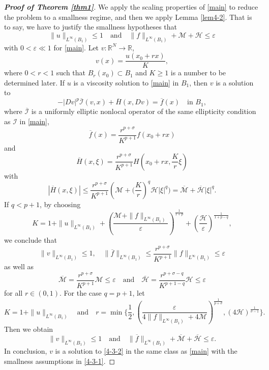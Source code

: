 \documentclass[11pt,reqno]{amsart}
\numberwithin{equation}{section}
\begin{document}
\begin{proof}[\textbf{Proof of Theorem \ref{thm1}}]
We apply the scaling properties of \eqref{main} to reduce the problem to a smallness regime, and then we apply Lemma \ref{lem4-2}. That is to say, we have to justify the smallness hypotheses that
\begin{equation}
\label{4-3-1}
\|u\|_{L^\infty(B_1)}\le1 \quad\text{and}\quad  \|f\|_{L^\infty(B_1)}+\mathcal{M}+\mathcal{H}\le \varepsilon
\end{equation}
with $0<\varepsilon\ll1$ for \eqref{main}. Let $v:\mathbb{R}^N\rightarrow\mathbb{R}$,
$$
v(x)=\frac{u(x_0+rx)}{K},
$$
where $0<r<1$ such that $B_r(x_0)\subset B_1$ and $K\ge1$ is a number to be determined later. If $u$ is a viscosity solution to \eqref{main} in $B_1$, then $v$ is a solution to
\begin{equation}
\label{4-3-2}
-|Dv|^p\overline{\mathcal{I}}(v,x)+\overline{H}(x,Dv)=\overline{f}(x) \quad\text{in } B_1,
\end{equation}
where $\overline{\mathcal{I}}$ is a uniformly elliptic nonlocal operator of the same ellipticity condition as $\mathcal{I}$ in \eqref{main},
$$
\overline{f}(x)=\frac{r^{p+\sigma}}{K^{p+1}}f(x_0+rx)
$$
and
$$
\overline{H}(x,\xi)=\frac{r^{p+\sigma}}{K^{p+1}}H\left(x_0+rx,\frac{K}{r}\xi\right)
$$
with
$$
|\overline{H}(x,\xi)|\le\frac{r^{p+\sigma}}{K^{p+1}}\left(\mathcal{M}+\biggl(\frac{K}{r}\right)^q\mathcal{H}|\xi|^q\biggr)=\overline{\mathcal{M}}
+\overline{\mathcal{H}}|\xi|^q.
$$
If $q<p+1$, by choosing
$$
K=1+\|u\|_{L^\infty(B_1)}+\left(\frac{\mathcal{M}+\|f\|_{L^\infty(B_1)}}{\varepsilon}\right)^\frac{1}{1+p}+\left(\frac{\mathcal{H}}{\varepsilon}
\right)^\frac{1}{1+p-q},
$$
we conclude that
$$
\|v\|_{L^\infty(B_1)}\le1, \quad \|\overline{f}\|_{L^\infty(B_1)}\le \frac{r^{p+\sigma}}{K^{p+1}}\|f\|_{L^\infty(B_1)}\le\varepsilon
$$
as well as
$$
\overline{\mathcal{M}}=\frac{r^{p+\sigma}}{K^{p+1}}\mathcal{M}\le\varepsilon
\quad\text{and}\quad
\overline{\mathcal{H}}=\frac{r^{p+\sigma-q}}{K^{p+1-q}}\mathcal{H}\le\varepsilon
$$
for all $r\in(0,1)$. For the case $q=p+1$, let
$$
K=1+\|u\|_{L^\infty(B_1)} \quad\text{and}\quad  r=\min\biggl\{\frac{1}{2},\left(\frac{\varepsilon}{4\|f\|_{L^\infty(B_1)}+4\mathcal{M}}\right)^\frac{1}{p+\sigma},\left(4\mathcal{H}\right)
^\frac{1}{\sigma-1}\biggr\}.
$$
Then we obtain
$$
\|v\|_{L^\infty(B_1)}\le1 \quad\text{and}\quad  \|\overline{f}\|_{L^\infty(B_1)}+\overline{\mathcal{M}}+\overline{\mathcal{H}}\le\varepsilon.
$$
In conclusion, $v$ is a solution to \eqref{4-3-2} in the same class as \eqref{main} with the smallness assumptions in \eqref{4-3-1}.


\end{proof}
\end{document}
